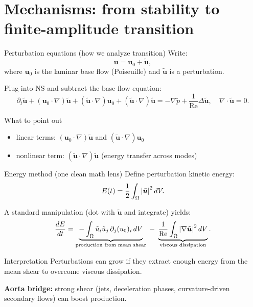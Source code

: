 \documentclass[aspectratio=169]{beamer}
\newcommand{\uu}{\bm{u}}
\newcommand{\Rey}{\mathrm{Re}}
\newcommand{\grad}{\nabla}
\newcommand{\Div}{\nabla\cdot}
\newcommand{\Lap}{\Delta}
\begin{document}
\section{Mechanisms: from stability to finite-amplitude transition}

\begin{frame}{Perturbation equations (how we analyze transition)}
Write:
\[
\uu = \uu_0 + \tilde{\uu},
\]
where $\uu_0$ is the laminar base flow (Poiseuille) and $\tilde{\uu}$ is a perturbation.

Plug into NS and subtract the base-flow equation:
\[
\partial_t \tilde{\uu} + (\uu_0\cdot\grad)\tilde{\uu} + (\tilde{\uu}\cdot\grad)\uu_0
+(\tilde{\uu}\cdot\grad)\tilde{\uu}
= -\grad \tilde{p} + \frac{1}{\Rey}\Lap \tilde{\uu},
\quad \Div \tilde{\uu}=0.
\]

\begin{block}{What to point out}
\begin{itemize}
  \item linear terms: $(\uu_0\cdot\grad)\tilde{\uu}$ and $(\tilde{\uu}\cdot\grad)\uu_0$
  \item nonlinear term: $(\tilde{\uu}\cdot\grad)\tilde{\uu}$ (energy transfer across modes)
\end{itemize}
\end{block}
\end{frame}

\begin{frame}{Energy method (one clean math lens)}
Define perturbation kinetic energy:
\[
E(t)=\frac12\int_\Omega \abs{\tilde{\uu}}^2\,dV.
\]

A standard manipulation (dot with $\tilde{\uu}$ and integrate) yields:
\[
\frac{dE}{dt} = \underbrace{-\int_\Omega \tilde{u}_i \tilde{u}_j\,\partial_j (u_0)_i\,dV}_{\text{production from mean shear}}
\;-\;\underbrace{\frac{1}{\Rey}\int_\Omega \abs{\grad \tilde{\uu}}^2\,dV}_{\text{viscous dissipation}}.
\]

\begin{block}{Interpretation}
Perturbations can grow if they extract enough energy from the mean shear to overcome viscous dissipation.
\end{block}

\textbf{Aorta bridge:} strong shear (jets, deceleration phases, curvature-driven secondary flows) can boost production.
\end{frame}
\end{document}
